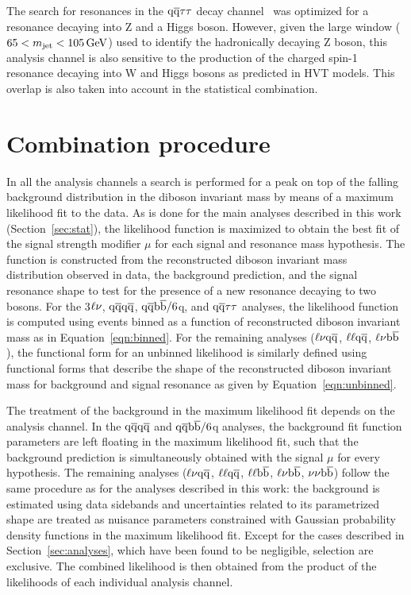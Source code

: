 The search for resonances in the $\mathrm{q}\overline{\mathrm{q}} \tau\tau$ decay channel~\cite{Khachatryan:2015bma} was optimized for a resonance \Zpr decaying into Z and a Higgs boson.
However, given the large \mJ window ($65 <  m_{\text{jet}} < 105\,\text{Ge\hspace{-.08em}V}$) used to identify the hadronically decaying Z boson, this analysis channel is also sensitive to the production of the charged spin-1 \Wpr resonance decaying into W and Higgs bosons as predicted in HVT models. This overlap is also taken into account in the statistical combination.

\section{Combination procedure}\label{sec:combination}

In all the analysis channels a search is performed for a peak on top of the falling background distribution in the diboson invariant mass by means of a maximum likelihood fit to the data.
As is done for the main analyses described in this work (Section~\ref{sec:stat}), the likelihood function is maximized to obtain the best fit of the signal strength modifier $\mu$ for each signal and resonance mass hypothesis.
The function is constructed from the reconstructed diboson invariant mass distribution observed in data, the background prediction, and the signal resonance shape to test for the presence of a new resonance decaying to two bosons.
For the 3$\ell\nu$, $\mathrm{q}\overline{\mathrm{q}} \mathrm{q}\overline{\mathrm{q}}$, $\mathrm{q}\overline{\mathrm{q}}{\mathrm{b}\overline{\mathrm{b}}}/6$q, and $\mathrm{q}\overline{\mathrm{q}} \tau\tau $ analyses, the likelihood function is computed using events binned as a function of reconstructed diboson invariant mass as in Equation~\ref{eqn:binned}.
For the remaining analyses ($\ell \nu \mathrm{q}\overline{\mathrm{q}}$,  $\ell\ell \mathrm{q}\overline{\mathrm{q}}$, $\ell \nu {\mathrm{b}\overline{\mathrm{b}}}$), the functional form for an unbinned likelihood is similarly defined using functional forms that describe the shape of the reconstructed diboson invariant mass for background and signal resonance as given by Equation~\ref{eqn:unbinned}.

The treatment of the background in the maximum likelihood fit depends on the analysis channel.
In the $\mathrm{q}\overline{\mathrm{q}} \mathrm{q}\overline{\mathrm{q}}$ and $\mathrm{q}\overline{\mathrm{q}}{\mathrm{b}\overline{\mathrm{b}}}/6$q analyses, the background fit function parameters are left floating in the maximum likelihood fit, such that the background prediction is simultaneously obtained with the signal $\mu$ for every hypothesis.
The remaining analyses ($\ell \nu \mathrm{q}\overline{\mathrm{q}}$,  $\ell\ell \mathrm{q}\overline{\mathrm{q}}$, $\ell \ell {\mathrm{b}\overline{\mathrm{b}}}$, $\ell \nu {\mathrm{b}\overline{\mathrm{b}}}$, $\nu \nu {\mathrm{b}\overline{\mathrm{b}}}$) follow the same procedure as for the analyses described in this work: the background is estimated using data sidebands and uncertainties related to its parametrized shape are treated as nuisance parameters constrained with Gaussian probability density functions in the maximum likelihood fit. Except for the cases described in Section~\ref{sec:analyses}, which have been found to be negligible, selection are exclusive. The combined likelihood is then obtained from the product of the likelihoods of each individual analysis channel.

